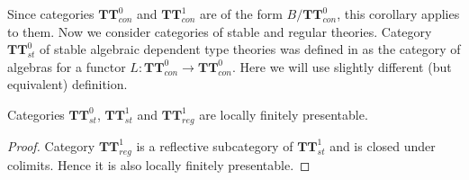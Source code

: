 \documentclass[reqno]{amsart}
\theoremstyle{definition}
\theoremstyle{remark}
\newcommand{\cat}[1]{\mathbf{#1}}
\newcommand{\algtt}{\cat{TT}}
\numberwithin{figure}{section}
\begin{document}
Since categories $\algtt^0_{con}$ and $\algtt^1_{con}$ are of the form $B/\algtt^0_{con}$, this corollary applies to them.
Now we consider categories of stable and regular theories.
Category $\algtt^0_{st}$ of stable algebraic dependent type theories was defined in \cite{alg-tt} as the category of algebras for a functor $L : \algtt^0_{con} \to \algtt^0_{con}$.
Here we will use slightly different (but equivalent) definition.

\begin{cor}
Categories $\algtt^0_{st}$, $\algtt^1_{st}$ and $\algtt^1_{reg}$ are locally finitely presentable.
\end{cor}
\begin{proof}
Category $\algtt^1_{reg}$ is a reflective subcategory of $\algtt^1_{st}$ and is closed under colimits.
Hence it is also locally finitely presentable.
\end{proof}
\end{document}

